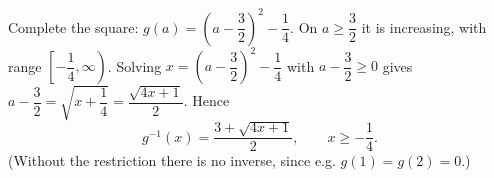 Complete the square: $g(a)=\left(a-\dfrac32\right)^2-\dfrac14$. On $a\ge\dfrac32$ it is increasing, with range $\left[-\dfrac14,\infty\right)$. Solving $x=\left(a-\dfrac32\right)^2-\dfrac14$ with $a-\dfrac32\ge0$ gives $a-\dfrac32=\sqrt{x+\dfrac14}=\dfrac{\sqrt{4x+1}}{2}$. Hence
\[g^{-1}(x)=\boxed{\dfrac{3+\sqrt{4x+1}}{2}},\qquad x\ge-\dfrac14.\]
(Without the restriction there is no inverse, since e.g. $g(1)=g(2)=0$.)
